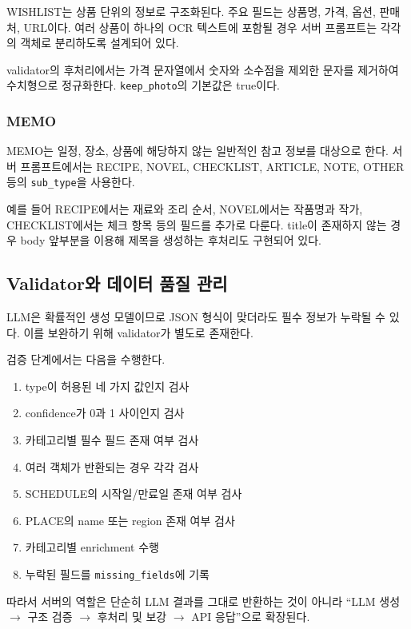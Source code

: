 \documentclass[11pt,a4paper]{article}
\begin{document}
WISHLIST는 상품 단위의 정보로 구조화된다. 주요 필드는 상품명, 가격, 옵션, 판매처, URL이다. 여러 상품이 하나의 OCR 텍스트에 포함될 경우 서버 프롬프트는 각각의 객체로 분리하도록 설계되어 있다.

validator의 후처리에서는 가격 문자열에서 숫자와 소수점을 제외한 문자를 제거하여 수치형으로 정규화한다. \texttt{keep\_photo}의 기본값은 true이다.

\subsubsection{MEMO}

MEMO는 일정, 장소, 상품에 해당하지 않는 일반적인 참고 정보를 대상으로 한다. 서버 프롬프트에서는 RECIPE, NOVEL, CHECKLIST, ARTICLE, NOTE, OTHER 등의 \texttt{sub\_type}을 사용한다.

예를 들어 RECIPE에서는 재료와 조리 순서, NOVEL에서는 작품명과 작가, CHECKLIST에서는 체크 항목 등의 필드를 추가로 다룬다. title이 존재하지 않는 경우 body 앞부분을 이용해 제목을 생성하는 후처리도 구현되어 있다.

\subsection{Validator와 데이터 품질 관리}

LLM은 확률적인 생성 모델이므로 JSON 형식이 맞더라도 필수 정보가 누락될 수 있다. 이를 보완하기 위해 validator가 별도로 존재한다.

검증 단계에서는 다음을 수행한다.

\begin{enumerate}
    \item type이 허용된 네 가지 값인지 검사
    \item confidence가 0과 1 사이인지 검사
    \item 카테고리별 필수 필드 존재 여부 검사
    \item 여러 객체가 반환되는 경우 각각 검사
    \item SCHEDULE의 시작일/만료일 존재 여부 검사
    \item PLACE의 name 또는 region 존재 여부 검사
    \item 카테고리별 enrichment 수행
    \item 누락된 필드를 \texttt{missing\_fields}에 기록
\end{enumerate}

따라서 서버의 역할은 단순히 LLM 결과를 그대로 반환하는 것이 아니라 ``LLM 생성 $\rightarrow$ 구조 검증 $\rightarrow$ 후처리 및 보강 $\rightarrow$ API 응답''으로 확장된다.
\end{document}
